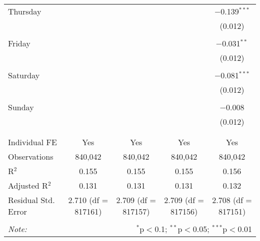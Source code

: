 \documentclass[
]{article}
\begin{document}
\begin{table}[!htbp]
{\begin{tabular}{@{\extracolsep{5pt}}lcccc}
 Thursday &  &  &  & $-$0.139$^{***}$ \\ 
  &  &  &  & (0.012) \\ 
  & & & & \\ 
 Friday &  &  &  & $-$0.031$^{**}$ \\ 
  &  &  &  & (0.012) \\ 
  & & & & \\ 
 Saturday &  &  &  & $-$0.081$^{***}$ \\ 
  &  &  &  & (0.012) \\ 
  & & & & \\ 
 Sunday &  &  &  & $-$0.008 \\ 
  &  &  &  & (0.012) \\ 
  & & & & \\ 
\hline \\[-1.8ex] 
Individual FE & Yes & Yes & Yes & Yes \\ 
Observations & 840,042 & 840,042 & 840,042 & 840,042 \\ 
R$^{2}$ & 0.155 & 0.155 & 0.155 & 0.156 \\ 
Adjusted R$^{2}$ & 0.131 & 0.131 & 0.131 & 0.132 \\ 
Residual Std. Error & 2.710 (df = 817161) & 2.709 (df = 817157) & 2.709 (df = 817156) & 2.708 (df = 817151) \\ 
\hline 
\hline \\[-1.8ex] 
\textit{Note:}  & \multicolumn{4}{r}{$^{*}$p$<$0.1; $^{**}$p$<$0.05; $^{***}$p$<$0.01} \\ 
\end{tabular}
} 
\end{table} 
\newpage
\end{document}
